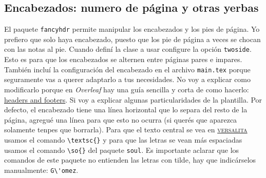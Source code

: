 \documentclass[a4paper,10pt,twocolumn,twoside]{article}
\begin{document}
\subsection{Encabezados: numero de página y otras yerbas}
El paquete \texttt{fancyhdr} permite manipular los encabezados y los pies de página. Yo prefiero que solo haya encabezado, puesto que los pie de página a veces se chocan con las notas al pie. Cuando definí la clase a usar configure la opción \texttt{twoside}. Esto es para que los encabezados se alternen entre páginas pares e impares. También incluí la configuración del encabezado en el archivo \texttt{main.tex} porque seguramente vas a querer adaptarlo a tus necesidades. No voy a explicar como modificarlo porque en \emph{Overleaf} hay una guía sencilla y corta de como hacerlo: \href{https://es.overleaf.com/learn/latex/headers_and_footers}{headers and footers}. Si voy a explicar algunas particularidades de la plantilla. Por defecto, el encabezado tiene una línea horizontal que lo separa del resto de la página, agregué una línea para que esto no ocurra (si querés que aparezca solamente tenpes que borrarla). Para que el texto central se vea en \href{https://es.wikipedia.org/wiki/Versalita}{\textsc{versalita}} usamos el comando \verb+\textsc{}+ y para que las letras se vean más espaciadas usamos el comando \verb+\so{}+ del paquete \texttt{soul}. Es importante aclarar que los comandos de este paquete no entienden las letras con tilde, hay que indicárselos manualmente: \verb+G\'omez+.
\end{document}
